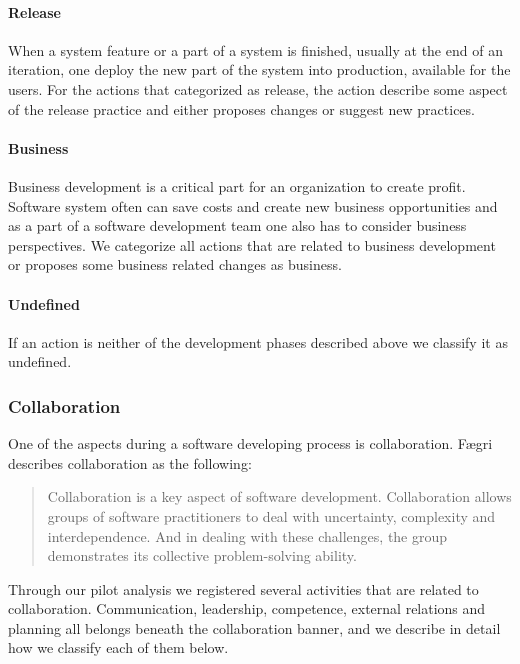 \paragraph{Release}
When a system feature or a part of a system is finished, usually at the end of an iteration, one deploy the new part of the system into production, available for the users. For the actions that categorized as release, the action describe some aspect of the release practice and either proposes changes or suggest new practices.
\paragraph{Business}
Business development is a critical part for an organization to create profit. Software system often can save costs and create new business opportunities and as a part of a software development team one also has to consider business perspectives. We categorize all actions that are related to business development or proposes some business related changes as business. 
\paragraph{Undefined} If an action is neither of the development phases described above we classify it as undefined. 
\subsubsection{Collaboration}
One of the aspects during a software developing process is collaboration. Fægri ~\cite{Faegri2012} describes collaboration as the following: 
\begin{quote}
Collaboration is a key aspect of software development. Collaboration allows groups of software practitioners to deal with uncertainty, complexity and interdependence. And in dealing with these challenges, the group demonstrates its collective problem-solving ability.
\end{quote}
Through our pilot analysis we registered several activities that are related to collaboration. Communication, leadership, competence, external relations and planning all belongs beneath the collaboration banner, and we describe in detail how we classify each of them below. 

